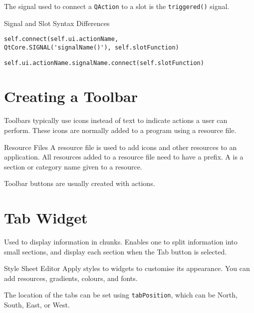 \documentclass[notes.tex]{subfiles}
\begin{document}
			The signal used to connect a \verb|QAction| to a slot is the \verb|triggered()| signal.
			\begin{sidenote}{Signal and Slot Syntax Differences}
				\begin{description}[style=nextline, leftmargin=1.5cm]
					\item[PyQt4] \verb|self.connect(self.ui.actionName,|\\
					\verb|QtCore.SIGNAL('signalName()'), self.slotFunction)|
					\item[PyQt5] \verb|self.ui.actionName.signalName.connect(self.slotFunction)| 
				\end{description}
			\end{sidenote}

		\section{Creating a Toolbar}
			Toolbars typically use icons instead of text to indicate actions a user can perform. These icons are normally added to a program using a resource file.
			\begin{definition}{Resource Files}
				A resource file is used to add icons and other resources to an application. All resources added to a resource file need to have a prefix. A  is a section or category name given to a resource.
			\end{definition}
			Toolbar buttons are usually created with actions.

		\section{Tab Widget}
			Used to display information in chunks. Enables one to split information into small sections, and display each section when the Tab button is selected.

			\begin{definition}{Style Sheet Editor}
				Apply styles to widgets to customise its appearance. You can add resources, gradients, colours, and fonts.
			\end{definition}

			The location of the tabs can be set using \verb|tabPosition|, which can be North, South, East, or West.
\end{document}
